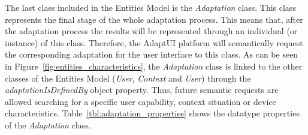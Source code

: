 The last class included in the Entities Model is the \textit{Adaptation} class.
This class represents the final stage of the whole adaptation process. This means
that, after the adaptation process the results will be represented through an
individual (or instance) of this class. Therefore, the AdaptUI platform will
semantically request the corresponding adaptation for the user interface to this
class. As can be seen in Figure~\ref{fig:entities_characteristics}, the
\textit{Adaptation} class is linked to the other classes of the Entities Model
(\textit{User}, \textit{Context} and \textit{User}) through the \textit{adaptationIsDefinedBy}
object property. Thus, future semantic requests are allowed searching for a
specific user capability, context situation or device characteristics.
Table~\ref{tbl:adaptation_properties} shows the datatype properties of the
\textit{Adaptation} class.



